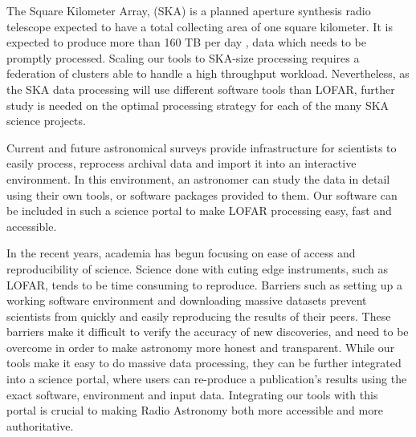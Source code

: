 The Square Kilometer Array, (SKA) is a planned aperture synthesis radio telescope expected to have a total collecting area of one square kilometer. It is expected to produce more than 160 TB per day \citep{johnston2017taming}, data which needs to be promptly processed. Scaling our tools to SKA-size processing requires a federation of clusters able to handle a high throughput workload. Nevertheless, as the SKA data processing will use different software tools than LOFAR, further study is needed on the optimal processing strategy for each of the many SKA science projects.

Current and future astronomical surveys provide infrastructure for scientists to easily process, reprocess archival data and import it into an interactive environment. In this environment, an astronomer can study the data in detail using their own tools, or software packages provided to them. Our software can be included in such a science portal to make LOFAR processing easy, fast and accessible.

In the recent years, academia has begun focusing on ease of access and reproducibility of science. Science done with cuting edge instruments, such as LOFAR, tends to be time consuming to reproduce. Barriers such as setting up a working software environment and downloading massive datasets prevent scientists from quickly and easily reproducing the results of their peers. These barriers make it difficult to verify the accuracy of new discoveries, and need to be overcome in order to make astronomy more honest and transparent. While our tools make it easy to do massive data processing, they can be further integrated into a science portal, where users can re-produce a publication's results using the exact software, environment and input data. Integrating our tools with this portal is crucial to making Radio Astronomy both more accessible and more authoritative.
